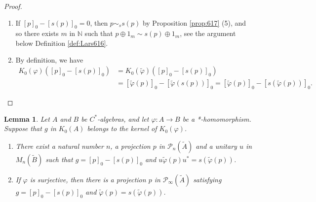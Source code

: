 \documentclass{book}
\newtheorem{lemma}[definition]{Lemma}
\def\cstars{\(C^*\)-algebras}
\begin{document}
\begin{proof}
\begin{enumerate}
      be a matrix obtained by applying \(s\) to each entry of \(v\) (in analogy with the definition of \(s_n\)). Then 
      \(s(v)^*s(v)=s(p)\) and \(s(v)s(v)^*=s(q)\), and so \(s(p)\sim_0 s(q)\).
      Hence \({[p]}_0={[q]}_0\) and \({[s(p)]}_0={[s(q)]}_0\), and this proves that (a) holds. 
    \item If \({[p]}_0-{[s(p)]}_0=0\), then \(p\sim_s s(p)\) by Proposition \ref{prop:617} (5), and so
      there exists \(m\) in \(\mathbb{N}\) such that \(p\oplus1_m\sim s(p)\oplus1_m\), see the argument below Definition \ref{def:Lars616}.
    \item By definition, we have
      \begin{align*}
        K_0(\varphi)({[p]}_0-{[s(p)]}_0)&=K_0(\tilde{\varphi})({[p]}_0-{[s(p)]}_0)\\
        &={[\tilde{\varphi}(p)]}_0-{[\tilde{\varphi}(s(p))]}_0={[\tilde{\varphi}(p)]}_0-{[s(\tilde{\varphi}(p))]}_0.
      \end{align*}
  \end{enumerate}
\end{proof}
\begin{lemma}\label{lemma:Lars723}
  Let \(A\) and \(B\) be \cstars, and let \(\varphi:A\to B\) be a *-homomorphism.
  Suppose that \(g\) in \(K_0(A)\) belongs to the kernel of \(K_0(\varphi)\).
  \begin{enumerate}
    \item There exist a natural number \(n\), a projection \(p\) in \(\mathcal{P}_n(\tilde{A})\) and a unitary
      \(u\) in \(M_n(\tilde{B})\) such that \(g={[p]}_0-{[s(p)]}_0\) and \(u\tilde{\varphi}(p)u^*=s(\tilde{\varphi}(p))\).
    \item If \(\varphi\) is surjective, then there is a projection \(p\) in \(\mathcal{P}_\infty(\tilde{A})\) satisfying 
      \(g={[p]}_0-{[s(p)]}_0\) and \(\tilde{\varphi}(p)=s(\tilde{\varphi}(p))\).
  \end{enumerate}
\end{lemma}
\end{document}
